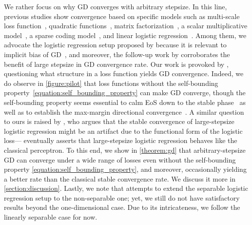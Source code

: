 We rather focus on why GD converges with arbitrary stepsize.
In this line, previous studies show convergence based on specific models such as multi-scale loss function~\citep{Kong2020NeurIPS}, quadratic functions~\citep{Arora2022ICML}, matrix factorization~\citep{Wang2022ICLR,Chen2023ICML}, a scalar multiplicative model~\citep{Zhu2023ICLR,Kreisler2023ICML}, a sparse coding model~\citep{Ahn2023NeurIPS}, and linear logistic regression~\citep{Wu2023NeurIPS}.
Among them, we advocate the logistic regression setup proposed by \citet{Wu2023NeurIPS} because it is relevant to implicit bias of GD~\citep{Soudry2018,Ji2019COLT,Ravi2024NeurIPS}, and moreover, the follow-up work by \citet{Wu2024COLT} corroborates the benefit of large stepsize in GD convergence rate.
Our work is provoked by \citet{Wu2024COLT}, questioning what structure in a loss function yields GD convergence.
Indeed, we do observe in \cref{figure:pilot} that loss functions without the self-bounding property~\eqref{equation:self_bounding_property} can make GD converge, though the self-bounding property seems essential to calm EoS down to the stable phase~\citep{Wu2024COLT} as well as to establish the max-margin directional convergence~\citep{Ji2019COLT,Ravi2024NeurIPS}. 
A similar question to ours is raised by \citet{Tyurin2024}, who argues that the stable convergence of large-stepsize logistic regression might be an artifact due to the functional form of the logistic loss---%
eventually \citet{Tyurin2024} asserts that large-stepsize logistic regression behaves like the classical perceptron.
To this end, we show in \cref{theorem:gd} that arbitrary-stepsize GD can converge under a wide range of losses even without the self-bounding property \eqref{equation:self_bounding_property},
and moreover, occasionally yielding a better rate than the classical stable convergence rate.
We discuss it more in \cref{section:discussion}.
Lastly, we note that \citet{Meng2024} attempts to extend the separable logistic regression setup to the non-separable one; yet, we still do not have satisfactory results beyond the one-dimensional case.
Due to its intricateness, we follow the linearly separable case for now.
